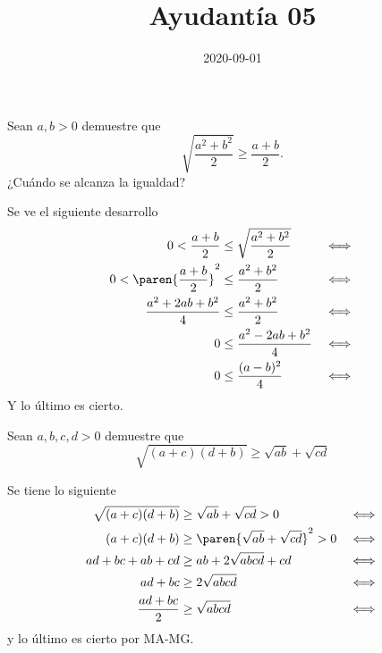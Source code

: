 \documentclass{ayudantia}
\title{Ayudantía 05}
\date{2020-09-01}
\begin{document}
\maketitle

\begin{prob}
    Sean \(a,b>0\) demuestre que
    \begin{equation*}
        \sqrt{\frac{a^2+b^2}2}\geq\frac{a+b}2.
    \end{equation*}
    ¿Cuándo se alcanza la igualdad?
\end{prob}

\begin{ans}
    \begin{sol}
        Se ve el siguiente desarrollo
        \begin{align*}
            0<\frac{a+b}2           & \leq\sqrt{\frac{a^2+b^2}2} & \iff \\
            0<\paren{\frac{a+b}2}^2 & \leq\frac{a^2+b^2}2        & \iff \\
            \frac{a^2+2ab+b^2}4     & \leq\frac{a^2+b^2}2        & \iff \\
            0                       & \leq\frac{a^2-2ab+b^2}4    & \iff \\
            0                       & \leq\frac{(a-b)^2}4        & \iff \\
        \end{align*}
        Y lo último es cierto.
    \end{sol}
\end{ans}


\begin{prob}
    Sean \(a,b,c,d>0\) demuestre que
    \begin{equation*}
        \sqrt{(a+c)(d+b)}\geq\sqrt{ab}+\sqrt{cd}
    \end{equation*}
\end{prob}

\begin{ans}
    \begin{sol}
        Se tiene lo siguiente
        \begin{align*}
            \sqrt{(a+c)(d+b)} & \geq\sqrt{ab}+\sqrt{cd} >0          & \iff \\
            (a+c)(d+b)        & \geq\paren{\sqrt{ab}+\sqrt{cd}}^2>0 & \iff \\
            ad+bc+ab+cd       & \geq ab+2\sqrt{abcd}+cd             & \iff \\
            ad+bc             & \geq2\sqrt{abcd}                    & \iff \\
            \frac{ad+bc}2     & \geq\sqrt{abcd}                     & \iff \\
        \end{align*}
        y lo último es cierto por MA-MG.
    \end{sol}
\end{ans}
\end{document}

